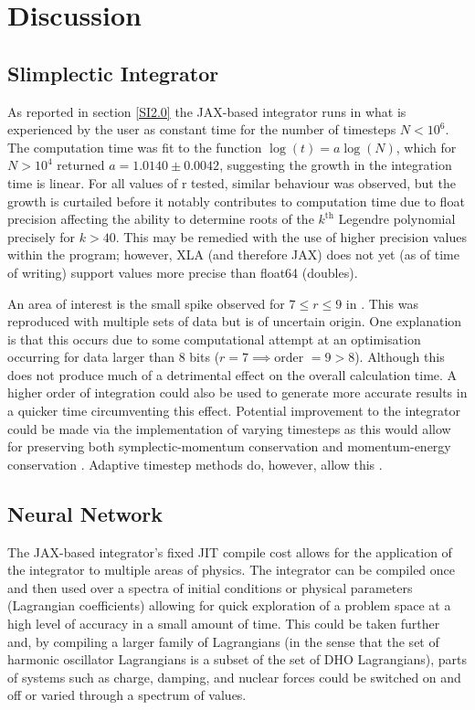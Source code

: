 \documentclass[10pt]{iopart}
\begin{document}
\section{Discussion}
\subsection{Slimplectic Integrator}
As reported in section \ref{SI2.0} the JAX-based integrator runs in what is experienced by the user as constant time for the number of timesteps $N<10^6$. The computation time was fit to the function $\log(t)=a\log(N)$,  which for $N>10^4$ returned $a = 1.0140\pm0.0042$, suggesting the growth in the integration time is linear. For all values of r tested, similar behaviour was observed, but the growth is curtailed before it notably contributes to computation time due to float precision affecting the ability to determine roots of the $k^{\textrm{th}}$ Legendre polynomial precisely for $k>40$. This may be remedied with the use of higher precision values within the program; however, XLA  (and therefore JAX) does not yet (as of time of writing) support values more precise than float64 (doubles). 

An area of interest is the small spike observed for $7\leq r \leq 9$ in . This was reproduced with multiple sets of data but is of uncertain origin. One explanation is that this occurs due to some computational attempt at an optimisation occurring for data larger than 8 bits ($r=7\implies$order $=9 > 8$). Although this does not produce much of a detrimental effect on the overall calculation time. A higher order of integration could also be used to generate more accurate results in a quicker time circumventing this effect. 
Potential improvement to the integrator could be made via the implementation of varying timesteps as this would allow for preserving both symplectic-momentum conservation and momentum-energy conservation \cite{Ge}. Adaptive  timestep methods do, however, allow this \cite{Kane}.

\subsection{Neural Network}
The JAX-based integrator's fixed JIT compile cost allows for the application of the integrator to multiple areas of physics. The integrator can be compiled once and then used over a spectra of initial conditions or physical parameters (Lagrangian coefficients) allowing for quick exploration of a problem space at a high level of accuracy in a small amount of time. This could be taken further and, by compiling a larger family of Lagrangians (in the sense that the set of harmonic oscillator Lagrangians is a subset of the set of DHO Lagrangians), parts of systems such as charge, damping, and nuclear forces could be switched on and off or varied through a spectrum of values.
\end{document}
